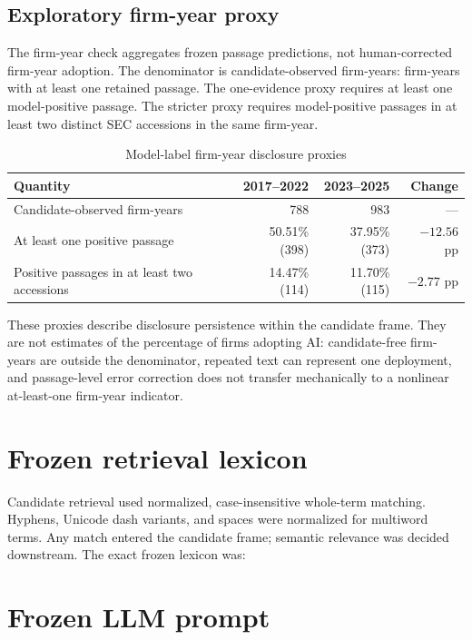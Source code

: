 \documentclass[11pt]{article}
\begin{document}
\subsection{Exploratory firm-year proxy}

The firm-year check aggregates frozen passage predictions, not human-corrected
firm-year adoption. The denominator is candidate-observed firm-years: firm-years
with at least one retained passage. The one-evidence proxy requires at least
one model-positive passage. The stricter proxy requires model-positive
passages in at least two distinct SEC accessions in the same firm-year.

\begin{table}[htbp]
\centering
\caption{Model-label firm-year disclosure proxies}
\small
\begin{tabularx}{\textwidth}{@{}Xrrr@{}}
\toprule
Quantity & 2017--2022 & 2023--2025 & Change \\
\midrule
Candidate-observed firm-years & 788 & 983 & --- \\
At least one positive passage & 50.51\% (398) & 37.95\% (373)
  & $-12.56$ pp \\
Positive passages in at least two accessions & 14.47\% (114) &
  11.70\% (115) & $-2.77$ pp \\
\bottomrule
\end{tabularx}
\end{table}

These proxies describe disclosure persistence within the candidate frame.
They are not estimates of the percentage of firms adopting AI: candidate-free
firm-years are outside the denominator, repeated text can represent one
deployment, and passage-level error correction does not transfer mechanically
to a nonlinear at-least-one firm-year indicator.

\section{Frozen retrieval lexicon}

Candidate retrieval used normalized, case-insensitive whole-term matching.
Hyphens, Unicode dash variants, and spaces were normalized for multiword
terms. Any match entered the candidate frame; semantic relevance was decided
downstream. The exact frozen lexicon was:


\section{Frozen LLM prompt}
\end{document}
